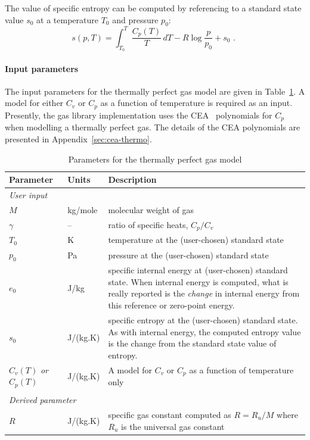 The value of specific entropy can be computed by referencing to
a standard state value $s_0$ at a temperature $T_0$ and pressure
$p_0$:
\begin{equation}
  s(p,T) = \int_{T_0}^{T} \frac{C_p(T)}{T}\,dT - R \log \frac{p}{p_0} + s_0 \text{ . }
\end{equation}

\paragraph{Input parameters}
The input parameters for the thermally perfect gas model
are given in Table~\ref{tab:tpg-params}.
A model for either $C_v$ or $C_p$ as a function
of temperature is required as an input.
Presently, the gas library implementation uses the 
CEA~\cite{mcbride_gordon_1996} polynomials for $C_p$
when modelling a thermally perfect gas.
The details of the CEA polynomials are presented in Appendix~\ref{sec:cea-thermo}.

\begin{table}[h]
\caption{Parameters for the thermally perfect gas model}
\label{tab:tpg-params}
\begin{tabular}{llp{10cm}}
\toprule
Parameter & Units & Description \\ \midrule
\multicolumn{3}{l}{\textit{User input}} \\
$M$       & kg/mole & molecular weight of gas \\
$\gamma$  &  --    & ratio of specific heats, $C_p/C_v$ \\
$T_0$     & K      & temperature at the (user-chosen) standard state \\
$p_0$     & Pa     & pressure at the (user-chosen) standard state \\
$e_0$     & J/kg   & specific internal energy at (user-chosen) standard state.
                    When internal energy is computed, what is really 
                    reported is the \emph{change} in internal energy
                    from this reference or zero-point energy. \\
$s_0$     & J/(kg.K) & specific entropy at the (user-chosen) standard state.
                       As with internal energy, the computed entropy value
                       is the change from the standard state value of entropy. \\
$C_v(T)$ \emph{or} $C_p(T)$ & J/(kg.K) & A model for $C_v$ or $C_p$ as a function of temperature only\\
 & & \\
\multicolumn{3}{l}{\textit{Derived parameter}} \\
$R$      & J/(kg.K) & specific gas constant computed as $R = R_u/M$ where
                      $R_u$ is the universal gas constant \\
\bottomrule
\end{tabular}
\end{table}

